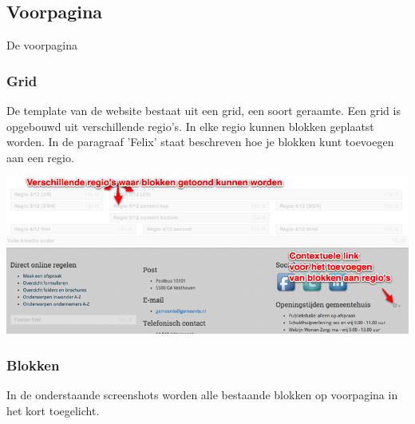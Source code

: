 
\subsection{Voorpagina}\label{voorpagina}

De voorpagina

\subsubsection{Grid}

De template van de website bestaat uit een grid, een soort geraamte. Een grid is opgebouwd uit verschillende regio's. In elke regio kunnen blokken geplaatst worden. In de paragraaf 'Felix' staat beschreven hoe je blokken kunt toevoegen aan een regio. 

\bigskip

\begin{center}
	\includegraphics[width=\textwidth]{img/grid1.png}
\end{center}


\subsubsection{Blokken}

In de onderstaande screenshots worden alle bestaande blokken op voorpagina in het kort toegelicht.

\bigskip

